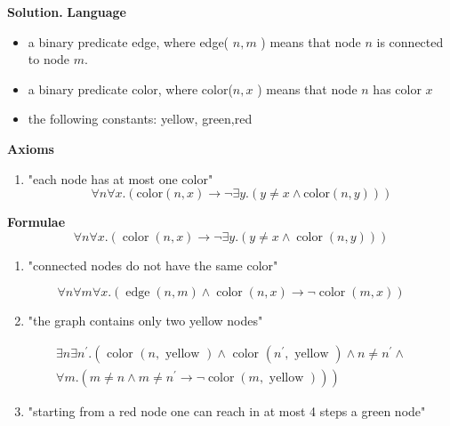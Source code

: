 {\color{sol}
\textbf{Solution.}
\textbf{Language}
\begin{itemize}
  \item a binary predicate edge, where edge( $n, m$ ) means that node $n$ is connected to node $m$.
  \item a binary predicate color, where color($n, x$ ) means that node $n$ has color $x$
  \item the following constants: yellow, green,red
\end{itemize}

\textbf{Axioms}
\begin{enumerate}
  \item
    "each node has at most one color"
    $$\forall n \forall x . (\text{color}(n, x) \rightarrow \neg \exists y. (y \ne x \land \text{color}(n, y)))$$
\end{enumerate}

\textbf{Formulae}
$$
\forall n \forall x .(\operatorname{color}(n, x) \rightarrow \neg \exists y .(y \neq x \wedge \operatorname{color}(n, y)))
$$

\begin{enumerate}
  \item "connected nodes do not have the same color"
\end{enumerate}

$$
\forall n \forall m \forall x .(\operatorname{edge}(n, m) \wedge \operatorname{color}(n, x) \rightarrow \neg \operatorname{color}(m, x))
$$

\begin{enumerate}
  \setcounter{enumi}{1}
  \item "the graph contains only two yellow nodes"
\end{enumerate}

$$
\begin{array}{r}
\exists n \exists n^{\prime} .\left(\text { color }(n, \text { yellow }) \wedge \text { color }\left(n^{\prime}, \text { yellow }\right) \wedge n \neq n^{\prime} \wedge\right. \\
\left.\forall m .\left(m \neq n \wedge m \neq n^{\prime} \rightarrow \neg \operatorname{color}(m, \text { yellow })\right)\right)
\end{array}
$$

\begin{enumerate}
  \setcounter{enumi}{2}
  \item "starting from a red node one can reach in at most 4 steps a green node"
\end{enumerate}

}
